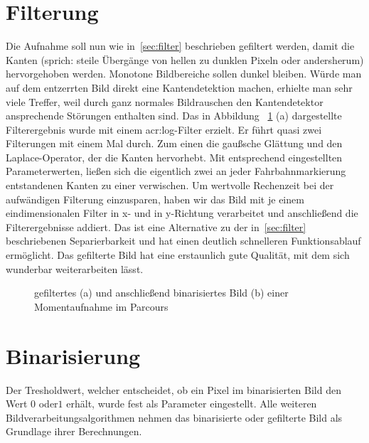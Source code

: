 \section{Filterung}
Die Aufnahme soll nun wie in~\ref{sec:filter} beschrieben gefiltert werden, damit die Kanten (sprich: steile Übergänge von hellen zu dunklen Pixeln oder andersherum) hervorgehoben werden. Monotone Bildbereiche sollen dunkel bleiben. Würde man auf dem entzerrten Bild direkt eine Kantendetektion machen, erhielte man sehr viele Treffer, weil durch ganz normales Bildrauschen den Kantendetektor ansprechende Störungen enthalten sind. Das in Abbildung ~\ref{fig:bildvorverarbeitung_filtern} (a) dargestellte Filterergebnis wurde mit einem \gls{acr:log}-Filter erzielt. Er führt quasi zwei Filterungen mit einem Mal durch. Zum einen die gaußsche Glättung und den Laplace-Operator, der die Kanten hervorhebt. Mit entsprechend eingestellten Parameterwerten, ließen sich die eigentlich zwei an jeder Fahrbahnmarkierung entstandenen Kanten zu einer verwischen. Um wertvolle Rechenzeit bei der aufwändigen Filterung einzusparen, haben wir das Bild mit je einem eindimensionalen Filter in x- und in y-Richtung verarbeitet und anschließend die Filterergebnisse addiert. Das ist eine Alternative zu der in~\ref{sec:filter} beschriebenen Separierbarkeit und hat einen deutlich schnelleren Funktionsablauf ermöglicht. Das gefilterte Bild hat eine erstaunlich gute Qualität, mit dem sich wunderbar weiterarbeiten lässt.


\begin{figure}[hb] %
  \centering
  \qquad
  \caption{gefiltertes (a) und anschließend binarisiertes Bild (b) einer Momentaufnahme im Parcours}
\label{fig:bildvorverarbeitung_filtern}
\end{figure} 

\section{Binarisierung}

Der Tresholdwert, welcher entscheidet, ob ein Pixel im binarisierten Bild den Wert \glqq \(0\)\grqq{} oder\glqq \(1\)\grqq{} erhält, wurde fest als Parameter eingestellt. Alle weiteren Bildverarbeitungsalgorithmen nehmen das binarisierte oder gefilterte Bild als Grundlage ihrer Berechnungen.